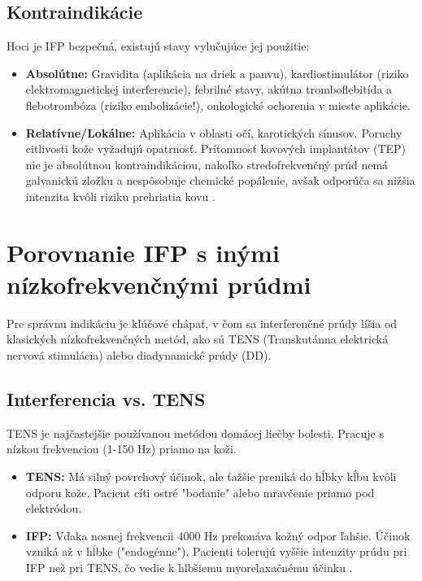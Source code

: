 \subsection{Kontraindikácie}
Hoci je IFP bezpečná, existujú stavy vylučujúce jej použitie:
\begin{itemize}
    \item \textbf{Absolútne:} Gravidita (aplikácia na driek a panvu), kardiostimulátor (riziko elektromagnetickej interferencie), febrilné stavy, akútna tromboflebitída a flebotrombóza (riziko embolizácie!), onkologické ochorenia v mieste aplikácie.
    \item \textbf{Relatívne/Lokálne:} Aplikácia v oblasti očí, karotických sínusov. Poruchy citlivosti kože vyžadujú opatrnosť. Prítomnosť kovových implantátov (TEP) nie je absolútnou kontraindikáciou, nakoľko stredofrekvenčný prúd nemá galvanickú zložku a nespôsobuje chemické popálenie, avšak odporúča sa nižšia intenzita kvôli riziku prehriatia kovu \parencite{Watson2020}.
\end{itemize}

\section{Porovnanie IFP s inými nízkofrekvenčnými prúdmi}
Pre správnu indikáciu je kľúčové chápať, v čom sa interferenčné prúdy líšia od klasických nízkofrekvenčných metód, ako sú TENS (Transkutánna elektrická nervová stimulácia) alebo diadynamické prúdy (DD).

\subsection{Interferencia vs. TENS}
TENS je najčastejšie používanou metódou domácej liečby bolesti. Pracuje s nízkou frekvenciou (1-150 Hz) priamo na koži.
\begin{itemize}
    \item \textbf{TENS:} Má silný povrchový účinok, ale ťažšie preniká do hĺbky kĺbu kvôli odporu kože. Pacient cíti ostré "bodanie" alebo mravčenie priamo pod elektródou.
    \item \textbf{IFP:} Vďaka nosnej frekvencii 4000 Hz prekonáva kožný odpor ľahšie. Účinok vzniká až v hĺbke ("endogénne"). Pacienti tolerujú vyššie intenzity prúdu pri IFP než pri TENS, čo vedie k hlbšiemu myorelaxačnému účinku \parencite{Goats1990}.
\end{itemize}

